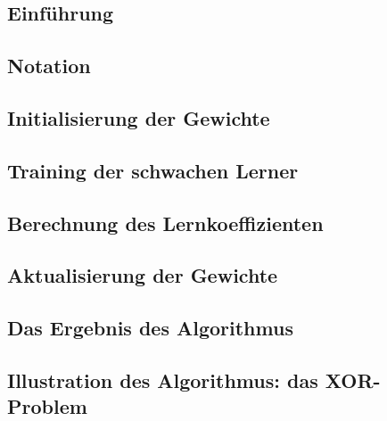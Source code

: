 \subsection*{Einführung}


\subsection*{Notation}


\subsection*{Initialisierung der Gewichte}


\subsection*{Training der schwachen Lerner}


\subsection*{Berechnung des Lernkoeffizienten}


\subsection*{Aktualisierung der Gewichte}


\subsection*{Das Ergebnis des Algorithmus}


\newpage
\subsection*{Illustration des Algorithmus: das XOR-Problem}
